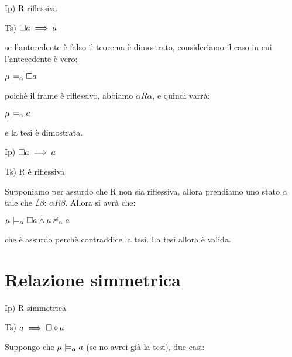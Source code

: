 Ip) R riflessiva

Ts) $\square a\implies a$

se l'antecedente è falso il teorema è dimostrato, consideriamo il
caso in cui l'antecedente è vero:

$\mu\models_{\alpha}\square a$

poichè il frame è riflessivo, abbiamo $\alpha R\alpha$, e quindi
varrà:

$\mu\models_{\alpha}a$

e la tesi è dimostrata.

\begin{center} 
 \end{center}

Ip) $\square a\implies a$

Ts) R è riflessiva

Supponiamo per assurdo che R non sia riflessiva, allora prendiamo
uno stato $\alpha$ tale che $\nexists\beta:\,\alpha R\beta$. Allora
si avrà che:

$\mu\models_{\alpha}\square a\wedge\mu\nvDash_{\alpha}a$

che è assurdo perchè contraddice la tesi. La tesi allora è valida.

\begin{center} 
\end{center}


\section{Relazione simmetrica}

Ip) R simmetrica

Ts) $a\implies\square\diamond a$

Suppongo che $\mu\models_{\alpha}a$ (se no avrei già la tesi), due
casi:

